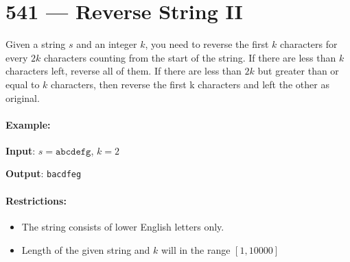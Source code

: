 \section{541 --- Reverse String II}
Given a string $s$ and an integer $k$, you need to reverse the first $k$ characters for every $2k$ characters counting from the start of the string. If there are less than $k$ characters left, reverse all of them. If there are less than $2k$ but greater than or equal to $k$ characters, then reverse the first k characters and left the other as original.

\paragraph{Example:}

\begin{flushleft}
\textbf{Input}: $s = \texttt{abcdefg}$, $k = 2$

\textbf{Output}: \texttt{bacdfeg}
\end{flushleft}

\paragraph{Restrictions:}

\begin{itemize}
\item The string consists of lower English letters only.
\item Length of the given string and $k$ will in the range $[1, 10000]$
\end{itemize}
